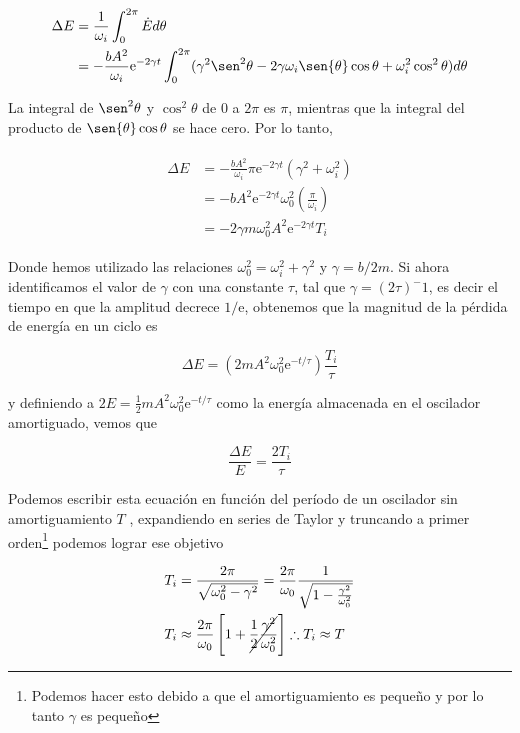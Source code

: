 \documentclass[a4paper,10pt]{article}
\numberwithin{equation}{section}
\newcommand{\euler}{\mathrm{e}}
\begin{document}
\begin{align}
 \begin{split}
  \Delta E &= \frac{1}{\omega_i} \int_0^{2\pi} \dot{E} d\theta \\
  &= - \frac{bA^2}{\omega_i}\euler^{-2\gamma t}\int_0^{2\pi} 
  (\gamma^2 \sen^2{\theta} - 2\gamma \omega_i \sen{\theta} \cos{\theta} + \omega_i^2 \cos^2{\theta}) d\theta
 \end{split}
\end{align}

La integral de $\sen^2{\theta}$ y $ \cos^2{\theta}$ de 0 a $2\pi$ es $\pi$, mientras
que la integral del producto de $\sen{\theta}\cos{\theta}$ se hace cero. Por lo tanto,

\begin{align}
 \begin{split}
  \Delta E &= - \frac{bA^2}{\omega_i}\pi \euler^{-2\gamma t}(\gamma^2 + \omega_i^2) \\
  &= - b A^2 \euler^{-2\gamma t}\omega_0^2\left(\frac{\pi}{\omega_i}\right) \\
  &= - 2\gamma m \omega_0^2 A^2 \euler^{-2\gamma t}T_i
 \end{split}
\end{align}

Donde hemos utilizado las relaciones $\omega_0^2 = \omega_i^2 + \gamma^2$ y
$\gamma = b/2m$. Si ahora identificamos el valor de $\gamma$ con una
constante $\tau$, tal que $\gamma = (2\tau)^-1$, es decir el tiempo en que 
la amplitud decrece $1/\euler$, obtenemos que la magnitud de la pérdida de energía 
en un ciclo es

$$
\Delta E = \left(2mA^2\omega_0^2\euler^{-t/\tau}\right)\frac{T_i}{\tau}
$$

y definiendo a $2E=\frac{1}{2}mA^2\omega_0^2\euler^{-t/\tau}$ como la energía
almacenada en el oscilador amortiguado, vemos que 

\begin{equation}
 \frac{\Delta E}{E} = \frac{2T_i}{\tau}
\end{equation}

Podemos escribir esta ecuación en función del período de un oscilador sin amortiguamiento $T$
, expandiendo en series de Taylor y truncando a primer orden\footnote{Podemos hacer esto debido
a que el amortiguamiento es pequeño y por lo tanto $\gamma$ es pequeño} podemos 
lograr ese objetivo

\begin{align*}
 \begin{split}
  T_i &= \frac{2\pi}{\sqrt{\omega_0^2-\gamma^2}} = \frac{2\pi}{\omega_0}\frac{1}{\sqrt{1-\frac{\gamma^2}{\omega_0^2}}} \\
  T_i &\approx \frac{2\pi}{\omega_0} \left[1 + \cancel{\frac{1}{2}\frac{\gamma^2}{\omega_0^2}} \right]
  \therefore T_i \approx T
 \end{split}
\end{align*}
\end{document}
